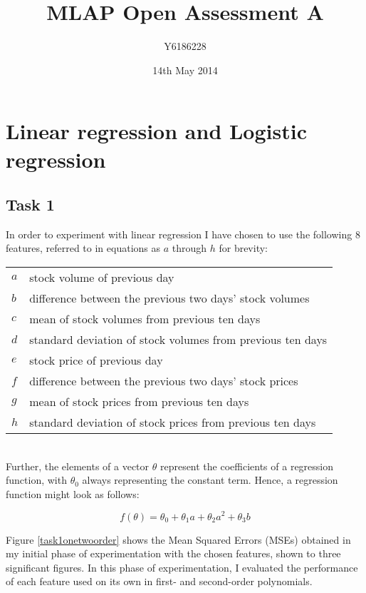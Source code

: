\documentclass[a4paper,11pt]{article}
\title{MLAP Open Assessment A}
\author{Y6186228}
\date{14th May 2014}
\newcommand*{\foc}[3]{f(\theta) = \theta_0 + \theta_1 {#1} + \theta_2 {#2} + \theta_3 {#3}}
\begin{document}
\maketitle

\section{Linear regression and Logistic regression}
\subsection{Task 1}
In order to experiment with linear regression I have chosen to use the following 8 features, referred to in equations as $a$ through $h$ for brevity:\\

\begin{tabular}{l l}
	$a$	& stock volume of previous day \\
	$b$	& difference between the previous two days' stock volumes \\
	$c$	& mean of stock volumes from previous ten days \\
	$d$	& standard deviation of stock volumes from previous ten days \\
	$e$	& stock price of previous day \\
	$f$	& difference between the previous two days' stock prices \\
	$g$	& mean of stock prices from previous ten days \\
	$h$	& standard deviation of stock prices from previous ten days
\end{tabular}\\

Further, the elements of a vector $\theta$ represent the coefficients of a regression function, with $\theta_0$ always representing the constant term.  Hence, a regression function might look as follows:

\[ \foc{a}{a^2}{b} \]

Figure \ref{task1onetwoorder} shows the Mean Squared Errors (MSEs) obtained in my initial phase of experimentation with the chosen features, shown to three significant figures.  In this phase of experimentation, I evaluated the performance of each feature used on its own in first- and second-order polynomials.
\end{document}
